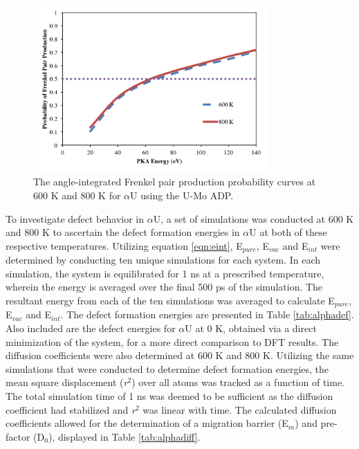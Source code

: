 \documentclass[review]{elsarticle}
\begin{document}
\begin{figure}[h]
 \centering
 \includegraphics[width=0.8\textwidth]{alpha.png} 	
 \caption{The angle-integrated Frenkel pair production probability curves at 600 K and 800 K for $\alpha$U using the U-Mo ADP.}
 \label{fig:alpha}
\end{figure}

\FloatBarrier

To investigate defect behavior in $\alpha$U, a set of simulations was conducted at 600 K and 800 K to ascertain the defect formation energies in $\alpha$U at both of these respective temperatures. Utilizing equation \ref{eqn:eint}, E$_{pure}$, E$_{vac}$ and E$_{int}$ were determined by conducting ten unique simulations for each system. In each simulation, the system is equilibrated for 1 ns at a prescribed temperature, wherein the energy is averaged over the final 500 ps of the simulation. The resultant energy from each of the ten simulations was averaged to calculate E$_{pure}$, E$_{vac}$ and E$_{int}$. The defect formation energies are presented in Table \ref{tab:alphadef}. Also included are the defect energies for $\alpha$U at 0 K, obtained via a direct minimization of the system, for a more direct comparison to DFT results. The diffusion coefficients were also determined at 600 K and 800 K. Utilizing the same simulations that were conducted to determine defect formation energies, the mean square displacement (\textit{r}$^{2}$) over all atoms was tracked as a function of time. The total simulation time of 1 ns was deemed to be sufficient as the diffusion coefficient had stabilized and \textit{r}$^{2}$ was linear with time. The calculated diffusion coefficients allowed for the determination of a migration barrier (E$_{m}$) and pre-factor (D$_{0}$), displayed in Table \ref{tab:alphadiff}.
\end{document}
